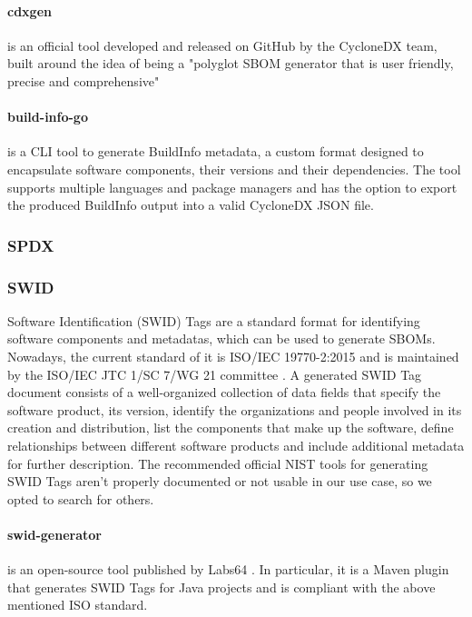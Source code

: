 \paragraph{cdxgen} is an official tool developed and released on GitHub by the CycloneDX team, built around the idea of being a "polyglot SBOM generator that is user friendly, precise and comprehensive"

\paragraph{build-info-go} is a CLI tool to generate BuildInfo metadata, a custom format designed to encapsulate software components, their versions and their dependencies. The tool supports multiple languages and package managers and has the option to export the produced BuildInfo output into a valid CycloneDX JSON file.

\subsubsection{SPDX}

\subsubsection{SWID}
Software Identification (SWID) Tags \cite{standards:sbom:swid} are a standard format for identifying software components and metadatas, which can be used to generate SBOMs. Nowadays, the current standard of it is ISO/IEC 19770-2:2015 \cite{standards:swid:iso19770-2:2015} and is maintained by the ISO/IEC JTC 1/SC 7/WG 21 committee \cite{standards:swid:committee}.
A generated SWID Tag document consists of a well-organized collection of data fields that specify the software product, its version, identify the organizations and people involved in its creation and distribution, list the components that make up the software, define relationships between different software products and include additional metadata for further description.
The recommended official NIST tools for generating SWID Tags aren't properly documented or not usable in our use case, so we opted to search for others.


\paragraph{swid-generator} is an open-source tool published by Labs64 \cite{repo:swid-generator}. In particular, it is a Maven plugin that generates SWID Tags for Java projects and is compliant with the above mentioned ISO standard.

